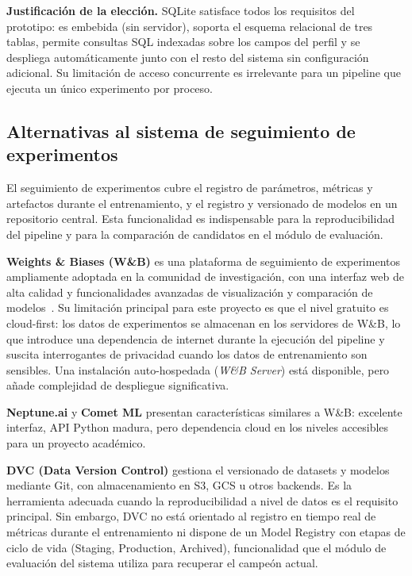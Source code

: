 \textbf{Justificación de la elección.} SQLite satisface todos los requisitos del prototipo: es embebida (sin servidor), soporta el esquema relacional de tres tablas, permite consultas SQL indexadas sobre los campos del perfil y se despliega automáticamente junto con el resto del sistema sin configuración adicional. Su limitación de acceso concurrente es irrelevante para un pipeline que ejecuta un único experimento por proceso.


\subsection{Alternativas al sistema de seguimiento de experimentos}
\label{sec:alt-mlflow}

El seguimiento de experimentos cubre el registro de parámetros, métricas y artefactos durante el entrenamiento, y el registro y versionado de modelos en un repositorio central. Esta funcionalidad es indispensable para la reproducibilidad del pipeline y para la comparación de candidatos en el módulo de evaluación.

\textbf{Weights \& Biases (W\&B)} es una plataforma de seguimiento de experimentos ampliamente adoptada en la comunidad de investigación, con una interfaz web de alta calidad y funcionalidades avanzadas de visualización y comparación de modelos~\cite{wandb}. Su limitación principal para este proyecto es que el nivel gratuito es cloud-first: los datos de experimentos se almacenan en los servidores de W\&B, lo que introduce una dependencia de internet durante la ejecución del pipeline y suscita interrogantes de privacidad cuando los datos de entrenamiento son sensibles. Una instalación auto-hospedada (\emph{W\&B Server}) está disponible, pero añade complejidad de despliegue significativa.

\textbf{Neptune.ai} y \textbf{Comet ML} presentan características similares a W\&B: excelente interfaz, API Python madura, pero dependencia cloud en los niveles accesibles para un proyecto académico.

\textbf{DVC (Data Version Control)} gestiona el versionado de datasets y modelos mediante Git, con almacenamiento en S3, GCS u otros backends. Es la herramienta adecuada cuando la reproducibilidad a nivel de datos es el requisito principal. Sin embargo, DVC no está orientado al registro en tiempo real de métricas durante el entrenamiento ni dispone de un Model Registry con etapas de ciclo de vida (Staging, Production, Archived), funcionalidad que el módulo de evaluación del sistema utiliza para recuperar el campeón actual.

